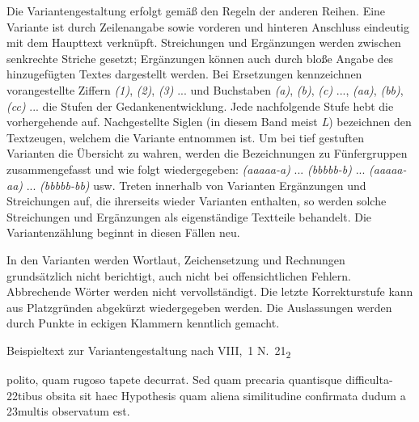 \noindent Die Variantengestaltung erfolgt gemäß den Regeln der anderen Reihen. Eine Variante ist durch Zeilenangabe sowie vorderen und hinteren Anschluss eindeutig mit dem Haupttext verknüpft.
Streichungen und Ergänzungen werden zwischen senkrechte Striche gesetzt;
Ergänzungen können auch durch bloße Angabe des hinzugefügten Textes dargestellt werden.
Bei Ersetzungen kennzeichnen vorangestellte Ziffern \textit{(1)}, \textit{(2)}, \textit{(3)} ... und Buchstaben \textit{(a)}, \textit{(b)}, \textit{(c)} ..., \textit{(aa)}, \textit{(bb)}, \textit{(cc)} ... die Stufen der Gedankenentwicklung. Jede nachfolgende Stufe hebt die vorhergehende auf. Nachgestellte Siglen (in diesem Band meist \textit{L}) bezeichnen den Textzeugen, welchem die Variante entnommen ist. Um bei tief gestuften Varianten die Übersicht zu wahren, werden die Bezeichnungen zu Fünfergruppen zusammengefasst und wie folgt wiedergegeben: \textit{(aaaaa-a)} ... \textit{(bbbbb-b)} ... \textit{(aaaaa-aa)} ... \textit{(bbbbb-bb)} usw. Treten innerhalb von Varianten Ergänzungen und Streichungen auf, die ihrerseits wieder Varianten enthalten, so werden solche Streichungen und Ergänzungen als eigenständige Textteile behandelt. Die Variantenzählung beginnt in diesen Fällen neu.
\par
In den Varianten werden Wortlaut, Zeichensetzung und Rechnungen grundsätzlich nicht berichtigt, auch nicht bei offensichtlichen Fehlern. Abbrechende Wörter werden nicht vervollständigt. Die letzte Korrekturstufe kann aus Platzgründen abgekürzt wiedergegeben werden. Die Auslassungen werden durch Punkte in eckigen Klammern kenntlich gemacht.
\par
\medskip

\noindent Beispieltext zur Variantengestaltung nach VIII,~1 N.~21\textsubscript{2}
\par
\smallskip

\hspace{5mm}polito, quam rugoso tapete decurrat. Sed quam precaria quantisque difficulta-\newline %
{\scriptsize22}\hspace{5mm}tibus obsita sit haec Hypothesis quam aliena similitudine confirmata dudum a\newline
{\scriptsize23}\hspace{5mm}multis observatum est.
\par
\bigskip


